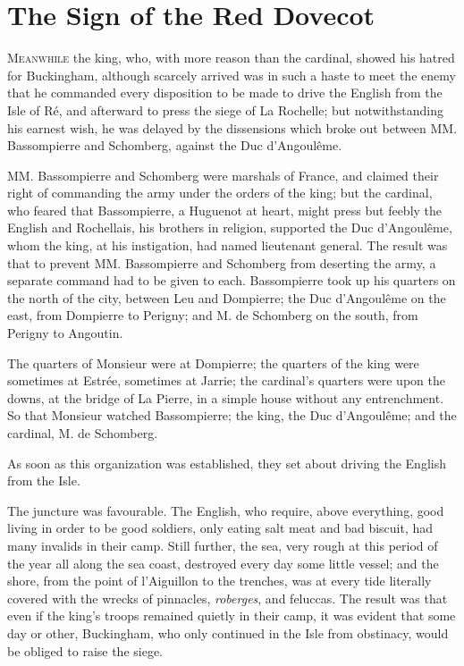 
\chapter{The Sign of the Red Dovecot}

\lettrine[]{M}{eanwhile} the king, who, with more reason than the cardinal, showed his hatred for Buckingham, although scarcely arrived was in such a haste to meet the enemy that he commanded every disposition to be made to drive the English from the Isle of Ré, and afterward to press the siege of La Rochelle; but notwithstanding his earnest wish, he was delayed by the dissensions which broke out between MM. Bassompierre and Schomberg, against the Duc d'Angoulême. 

MM. Bassompierre and Schomberg were marshals of France, and claimed their right of commanding the army under the orders of the king; but the cardinal, who feared that Bassompierre, a Huguenot at heart, might press but feebly the English and Rochellais, his brothers in religion, supported the Duc d'Angoulême, whom the king, at his instigation, had named lieutenant general. The result was that to prevent MM. Bassompierre and Schomberg from deserting the army, a separate command had to be given to each. Bassompierre took up his quarters on the north of the city, between Leu and Dompierre; the Duc d'Angoulême on the east, from Dompierre to Perigny; and M. de Schomberg on the south, from Perigny to Angoutin. 

The quarters of Monsieur were at Dompierre; the quarters of the king were sometimes at Estrée, sometimes at Jarrie; the cardinal's quarters were upon the downs, at the bridge of La Pierre, in a simple house without any entrenchment. So that Monsieur watched Bassompierre; the king, the Duc d'Angoulême; and the cardinal, M. de Schomberg. 

As soon as this organization was established, they set about driving the English from the Isle. 

The juncture was favourable. The English, who require, above everything, good living in order to be good soldiers, only eating salt meat and bad biscuit, had many invalids in their camp. Still further, the sea, very rough at this period of the year all along the sea coast, destroyed every day some little vessel; and the shore, from the point of l'Aiguillon to the trenches, was at every tide literally covered with the wrecks of pinnacles, \textit{roberges}, and feluccas. The result was that even if the king's troops remained quietly in their camp, it was evident that some day or other, Buckingham, who only continued in the Isle from obstinacy, would be obliged to raise the siege. 

